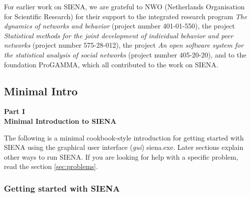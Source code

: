 \documentclass[a4paper,fleqn]{article}
\newcommand{\+}{\, + \,}
\newcommand{\SI}{{\sf SIENA }}
\newcommand{\si}{{\sf SIENA}}
\begin{document}
For earlier work on \si, we are grateful to NWO (Netherlands Organisation for
Scientific Research) for their support to the integrated research program
\emph{The dynamics of networks and behavior} (project number 401-01-550),
the project \emph{Statistical methods for the joint development of
individual behavior and peer networks} (project number 575-28-012),
the project \emph{An open software system for the statistical
analysis of social networks} (project number 405-20-20),
and to the foundation ProGAMMA,
which all contributed to the work on \si.

\newpage
\begin{print}
\part{Minimal Intro}
\end{print}
\begin{screen}
{\color{section0}\LARGE\bf\noindent
Part I\\[1.5ex] Minimal Introduction to \SI  \\[1.8ex]}
\end{screen}
The following is a minimal cookbook-style
introduction for getting started with \SI using
the graphical user interface (\emph{gui}) {siena.exe}. Later sections explain
other ways to run \si. If you are looking for help with a specific problem, read
the section \ref{sec:problems}.

\section{Getting started with \SI}
\label{S_minsi1}
\end{document}
